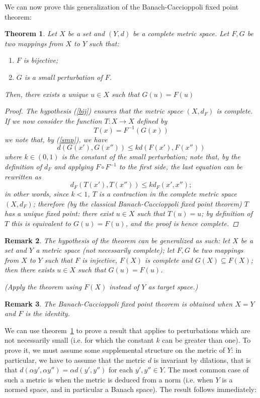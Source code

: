 \documentclass[12pt]{article}
\theoremstyle{normale}
\newtheorem{theorem}{Theorem}[section]
\theoremstyle{liscio}
\newtheorem{remark}[theorem]{Remark}
\begin{document}
We can now prove this generalization of the Banach-Caccioppoli
fixed point theorem:

\begin{theorem}\label{fixptgen}
Let $X$ be a set and $(Y, d)$ be a complete metric space. Let $F,
G$ be two mappings from $X$ to $Y$ such that:
\begin{enumerate}
\item \label{bij} $F$ is bijective;
\item \label{smp} $G$ is a small perturbation of $F$.
\end{enumerate}

Then, there exists a unique $u \in X$ such that $G(u)=F(u)$
\begin{proof}
The hypothesis (\ref{bij}) ensures that the metric space $(X,
d_F)$ is complete. If we now consider the function $T:X \to X$
defined by
\[
T(x) = F^{-1}(G(x))
\]
we note that, by (\ref{smp}), we have
\[
d(G(x'), G(x'')) \le k d(F(x'), F(x''))
\]
where $k \in (0,1)$ is the constant of the small perturbation;
note that, by the definition of $d_F$ and applying $F \circ
F^{-1}$ to the first side, the last equation can be rewritten as
\[
d_F(T(x'), T(x'')) \le k d_F(x', x'');
\]
in other words, since $k < 1$, $T$ is a contraction in the
complete metric space $(X, d_F)$; therefore (by the classical
Banach-Caccioppoli fixed point theorem) $T$ has a unique fixed
point: there exist $u \in X$ such that $T(u) = u$; by definition
of $T$ this is equivalent to $G(u) = F(u)$, and the proof is hence
complete.
\end{proof}
\end{theorem}

\begin{remark}
The hypothesis of the theorem can be generalized as such: let $X$
be a set and $Y$ a metric space (not necessarily complete); let
$F, G$ be two mappings from $X$ to $Y$ such that $F$ is injective,
$F(X)$ is complete and $G(X) \subseteq F(X)$; then there exists $u
\in X$ such that $G(u) = F(u)$.

(Apply the theorem using $F(X)$ instead of $Y$ as target space.)
\end{remark}

\begin{remark}
The Banach-Caccioppoli fixed point theorem is obtained when
$X=Y$ and $F$ is the identity.
\end{remark}

We can use theorem~\ref{fixptgen} to prove a result that applies
to perturbations which are not necessarily small (i.e. for which
the constant $k$ can be greater than one). To prove it, we must
assume some supplemental structure on the metric of $Y$: in
particular, we have to assume that the metric $d$ is invariant by
dilations, that is that $d(\alpha y', \alpha y'') = \alpha d (y',
y'')$ for each $y', y'' \in Y$. The most common case of such
a metric is when the metric is deduced from a norm (i.e. when $Y$
is a normed space, and in particular a Banach space). The result
follows immediately:
\end{document}
